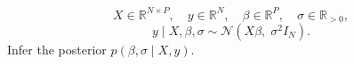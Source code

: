 \[
  X \in \mathbb{R}^{N \times P}, \quad
  y \in \mathbb{R}^{N}, \quad
  \beta \in \mathbb{R}^{P}, \quad
  \sigma \in \mathbb{R}_{>0},
\]
\[
  y \mid X, \beta, \sigma \sim \mathcal{N}\!\left(X\beta,\; \sigma^2 I_N\right).
\]
Infer the posterior $p(\beta, \sigma \mid X, y)$.
